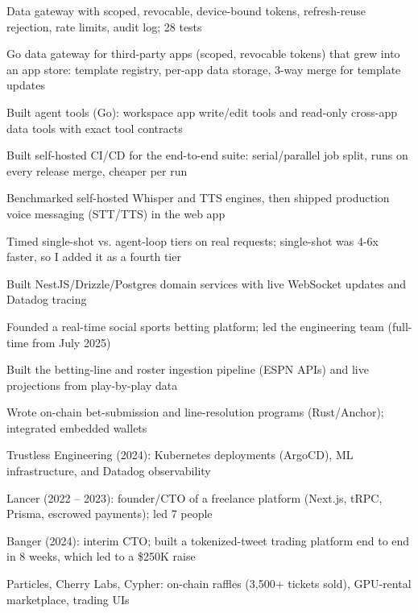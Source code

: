 \documentclass[print]{jack-resume}
\begin{document}
\begin{tightemize}
    \item Data gateway with scoped, revocable, device-bound tokens, refresh-reuse rejection, rate limits, audit log; 28 tests
    \item Go data gateway for third-party apps (scoped, revocable tokens) that grew into an app store: template registry, per-app data storage, 3-way merge for template updates
    \item Built agent tools (Go): workspace app write/edit tools and read-only cross-app data tools with exact tool contracts
    \item Built self-hosted CI/CD for the end-to-end suite: serial/parallel job split, runs on every release merge, cheaper per run
    \item Benchmarked self-hosted Whisper and TTS engines, then shipped production voice messaging (STT/TTS) in the web app
    \item Timed single-shot vs. agent-loop tiers on real requests; single-shot was 4-6x faster, so I added it as a fourth tier
\end{tightemize}
\sectionsep

\begin{tightemize}
    \item Built NestJS/Drizzle/Postgres domain services with live WebSocket updates and Datadog tracing
    \item Founded a real-time social sports betting platform; led the engineering team (full-time from July 2025)
    \item Built the betting-line and roster ingestion pipeline (ESPN APIs) and live projections from play-by-play data
    \item Wrote on-chain bet-submission and line-resolution programs (Rust/Anchor); integrated embedded wallets
\end{tightemize}
\sectionsep

\begin{tightemize}
    \item Trustless Engineering (2024): Kubernetes deployments (ArgoCD), ML infrastructure, and Datadog observability
    \item Lancer (2022 – 2023): founder/CTO of a freelance platform (Next.js, tRPC, Prisma, escrowed payments); led 7 people
    \item Banger (2024): interim CTO; built a tokenized-tweet trading platform end to end in 8 weeks, which led to a \$250K raise
    \item Particles, Cherry Labs, Cypher: on-chain raffles (3,500+ tickets sold), GPU-rental marketplace, trading UIs
\end{tightemize}
\sectionsep
\end{document}

